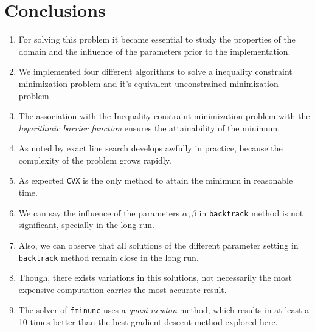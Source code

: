 \documentclass[a4paper,8pt,twocolumn]{article}
\begin{document}
\section*{Conclusions}
\footnotesize{
\begin{enumerate}
\item For solving this problem it became essential to study the properties of the domain and the influence of the parameters prior to the implementation.
\item We implemented four different algorithms to solve a inequality constraint minimization problem and it's equivalent unconstrained minimization problem.
\item The association with the Inequality constraint minimization problem with the \emph{logarithmic barrier function} ensures the attainability of the minimum.
\item As noted by \cite{Boyd2002} exact line search develops awfully in practice, because the complexity of the problem grows rapidly.
\item As expected \texttt{CVX} is the only method to attain the minimum in reasonable time.
\item We can say the influence of the parameters $\alpha, \beta$ in \texttt{backtrack} method is not significant, specially in the long run.
\item Also, we can observe that all solutions of the different parameter setting in \texttt{backtrack} method remain close in the long run. 
\item Though, there exists variations in this solutions, not necessarily the most expensive computation carries the most accurate result. 
\item The solver of \texttt{fminunc} uses a \emph{quasi-newton} method, which results in at least a 10 times better than the best gradient descent method explored here.
\end{enumerate}
}

\footnotesize{

}
\end{document}
